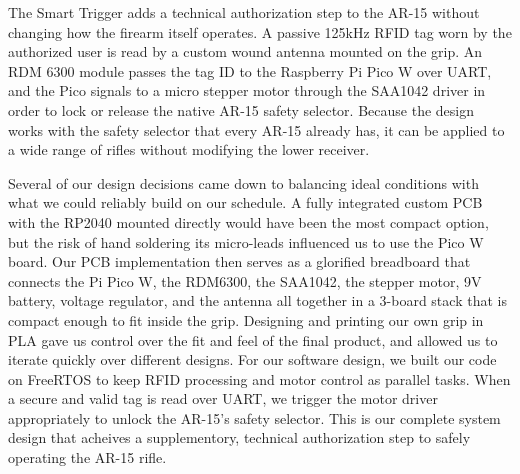The Smart Trigger adds a technical authorization step to the AR-15 
without changing how the firearm itself operates. A passive 125kHz RFID
tag worn by the authorized user is read by a custom wound antenna mounted
on the grip. An RDM 6300 module passes the tag ID to the Raspberry Pi Pico W
over UART, and the Pico signals to a micro stepper motor through the SAA1042
driver in order to lock or release the native AR-15 safety selector. Because
the design works with the safety selector that every AR-15 already has, it
can be applied to a wide range of rifles without modifying the lower receiver.

Several of our design decisions came down to balancing ideal conditions with
what we could reliably build on our schedule. A fully integrated custom PCB with
the RP2040 mounted directly would have been the most compact option, but the
risk of hand soldering its micro-leads influenced us to use the Pico W board.
Our PCB implementation then serves as a glorified breadboard that connects 
the Pi Pico W, the RDM6300, the SAA1042, the stepper motor, 9V battery, voltage
regulator, and the antenna all together in a 3-board stack that is compact
enough to fit inside the grip. Designing and printing our own grip in PLA gave
us control over the fit and feel of the final product, and allowed us to iterate
quickly over different designs. For our software design, we built our code on
FreeRTOS to keep RFID processing and motor control as parallel tasks. When a
secure and valid tag is read over UART, we trigger the motor driver
appropriately to unlock the AR-15's safety selector. This is our complete
system design that acheives a supplementory, technical authorization step to
safely operating the AR-15 rifle.
